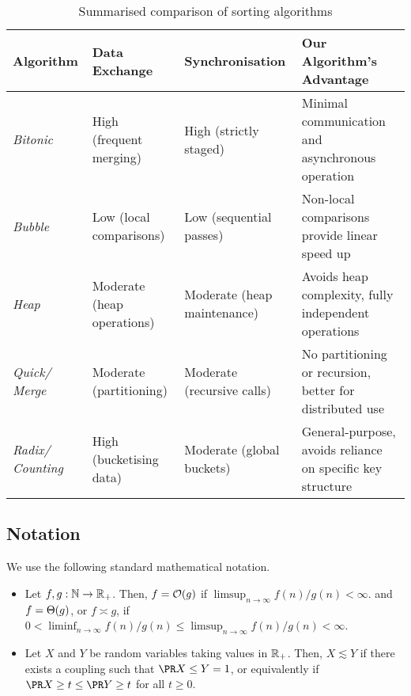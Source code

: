\documentclass{article}
\begin{document}
\begin{table}[t]
\centering
\renewcommand{\arraystretch}{1.3} %
\begin{tabular}{|p{1.55cm}|p{2.95cm}|p{3cm}|p{4.7cm}|}
	\hline
	\textbf{\textsf{Algorithm}}
&	\textbf{\textsf{Data Exchange}}
&	\textbf{\textsf{Synchronisation}}
&	\textbf{\textsf{Our Algorithm's Advantage}}
\\ \hline
	\textsl{\textsf{Bitonic}}
&	High \newline (frequent merging)
&	High \newline (strictly staged)
&	Minimal communication and asynchronous operation
\\ \hline
	\textsl{\textsf{Bubble}}
&	Low \newline (local comparisons)
&	Low \newline (sequential passes)
&	Non-local comparisons provide linear speed up
\\ \hline
	\textsl{\textsf{Heap}}
&	Moderate \newline (heap operations)
&	Moderate \newline (heap maintenance)
&	Avoids heap complexity, fully independent operations
\\ \hline
	\textsl{\textsf{Quick/ Merge}}
&	Moderate \newline (partitioning)
&	Moderate \newline (recursive calls)
&	No partitioning or recursion, better for distributed use
\\ \hline
	\textsl{\textsf{Radix/ Counting}}
&	High \newline (bucketising data)
&	Moderate \newline (global buckets)
&	General-purpose, avoids reliance on specific key structure
\\ \hline
\end{tabular}
\caption{Summarised comparison of sorting algorithms}
\label{tab:intro:sorting-comparison}
\end{table}


\subsection{Notation}

We use the following standard mathematical notation.
\begin{itemize}
	\item 
	Let $f, g : \mathbb{N} \to \mathbb{R}_+$.
	Then, 
		$f = \mathcal{O}( g )$ if $\limsup_{n\to\infty} f(n)/g(n) < \infty$.
	and
		$f = \Theta( g )$, or $f \asymp g$, if $0 < \liminf_{n\to\infty} f(n)/g(n) \le \limsup_{n\to\infty} f(n)/g(n) < \infty$.
	
	\item 
	Let $X$ and $Y$ be random variables taking values in $\mathbb{R}_+$.
	Then, $X \lesssim Y$ if there exists a coupling such that $\pr{X \le Y} = 1$, or equivalently if $\pr{ X \ge t } \le \pr{ Y \ge t }$ for all $t \ge 0$.
\end{itemize}
\end{document}
